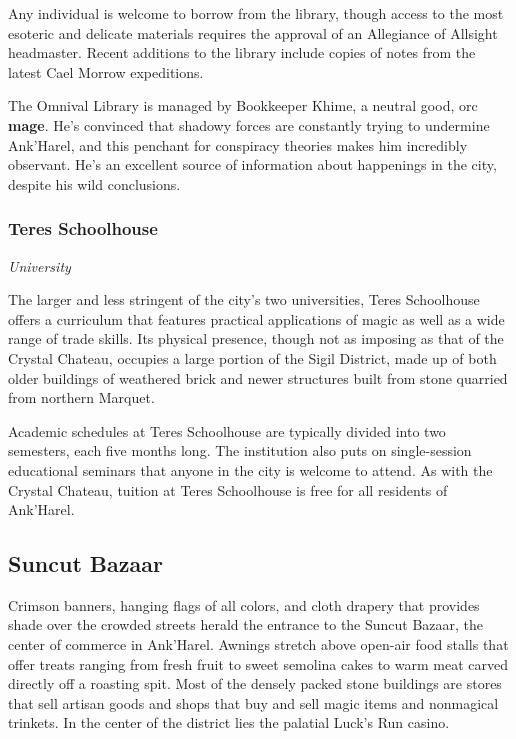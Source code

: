 \documentclass[letterpaper, 11pt, bg=full, twocolumn]{dndbook}
\begin{document}
Any individual is welcome to borrow from the library, though access to the most esoteric and delicate materials requires the approval of an Allegiance of Allsight headmaster. Recent additions to the library include copies of notes from the latest Cael Morrow expeditions.

The Omnival Library is managed by Bookkeeper Khime, a neutral good, orc \textbf{mage}. He's convinced that shadowy forces are constantly trying to undermine Ank'Harel, and this penchant for conspiracy theories makes him incredibly observant. He's an excellent source of information about happenings in the city, despite his wild conclusions.

\subsubsection{Teres Schoolhouse}

\textit{University}

The larger and less stringent of the city's two universities, Teres Schoolhouse offers a curriculum that features practical applications of magic as well as a wide range of trade skills. Its physical presence, though not as imposing as that of the Crystal Chateau, occupies a large portion of the Sigil District, made up of both older buildings of weathered brick and newer structures built from stone quarried from northern Marquet.

Academic schedules at Teres Schoolhouse are typically divided into two semesters, each five months long. The institution also puts on single-session educational seminars that anyone in the city is welcome to attend. As with the Crystal Chateau, tuition at Teres Schoolhouse is free for all residents of Ank'Harel.

\subsection{Suncut Bazaar}

Crimson banners, hanging flags of all colors, and cloth drapery that provides shade over the crowded streets herald the entrance to the Suncut Bazaar, the center of commerce in Ank'Harel. Awnings stretch above open-air food stalls that offer treats ranging from fresh fruit to sweet semolina cakes to warm meat carved directly off a roasting spit. Most of the densely packed stone buildings are stores that sell artisan goods and shops that buy and sell magic items and nonmagical trinkets. In the center of the district lies the palatial Luck's Run casino.
\end{document}
